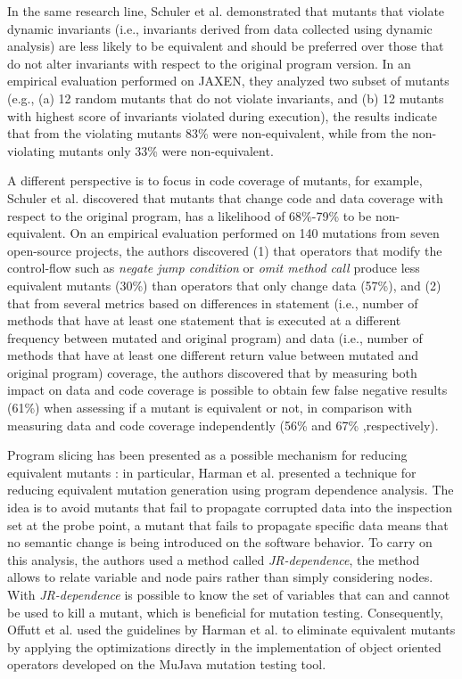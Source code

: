 In the same research line, Schuler et al. \cite{schuler2009efficient} demonstrated that mutants that violate dynamic invariants (i.e., invariants derived from data collected using dynamic analysis) are less likely to be equivalent and should be preferred over those that do not alter invariants with respect to the original program version. In an empirical evaluation performed on JAXEN, they analyzed two subset of mutants (e.g., (a) 12 random mutants that do not violate invariants, and (b) 12 mutants with highest score of invariants violated during execution), the results indicate that from the violating mutants 83\% were non-equivalent, while from the non-violating mutants only 33\% were non-equivalent.

A different perspective is to focus in code coverage of mutants, for example, Schuler et al. \cite{schuler2010covering,schuler2013covering} discovered that mutants that change code and data coverage with respect to the original program, has a likelihood of 68\%-79\% to be non-equivalent.
On an empirical evaluation performed on 140 mutations from seven open-source projects, the authors discovered (1) that operators that modify the control-flow such as \textit{negate jump condition} or \textit{omit method call} produce less equivalent mutants (30\%) than operators that only change data (57\%), and (2) that from several metrics based on differences in statement (i.e., number of methods that have at least one statement that is executed at a different frequency between mutated and original program) and data (i.e., number of methods that have at least one different return value between mutated and original program) coverage, the authors discovered that by measuring both impact on data and code coverage is possible to obtain few false negative results (61\%) when assessing if a mutant is equivalent or not, in comparison with measuring data and code coverage independently (56\% and 67\% ,respectively).

Program slicing has been presented as a possible mechanism for reducing equivalent mutants \cite{voas1997software, hierons1999using, harman2001relationship}: in particular, Harman et al. \cite{harman2001relationship} presented a technique for reducing equivalent mutation generation using program dependence analysis. The idea is to avoid mutants that fail to propagate corrupted data into the inspection set at the probe point, a mutant that fails to propagate specific data means that no semantic change is being introduced on the software behavior. To carry on this analysis, the authors used a method called \textit{JR-dependence}, the method allows to relate variable and node pairs rather than simply considering nodes. With \textit{JR-dependence} is possible to know the set of variables that can and cannot be used to kill a mutant, which is beneficial for mutation testing. 
Consequently, Offutt et al. \cite{offutt2006class} used the guidelines by Harman et al. \cite{harman2001relationship} to eliminate equivalent mutants by applying the optimizations directly in the implementation of object oriented operators developed on the MuJava mutation testing tool. 


